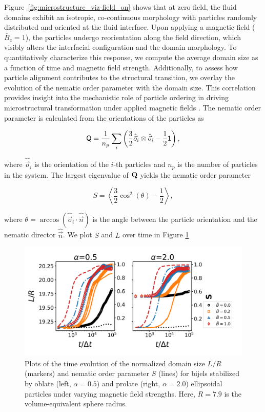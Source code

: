 Figure~\ref{fig:microstructure_viz-field_on} shows that at zero field, the fluid domains exhibit an isotropic, co-continuous morphology with particles randomly 
distributed and oriented at the fluid interface. Upon applying a magnetic field (\(\bar{B}_z = 1\)), the particles undergo reorientation along the field direction, 
which visibly alters the interfacial configuration and the domain morphology. 
To quantitatively characterize this response, we compute the average domain size as a function of time and magnetic field strength. Additionally, to assess 
how particle alignment contributes to the structural transition, we overlay the evolution of the nematic order parameter with the domain size. This correlation 
provides insight into the mechanistic role of particle ordering in driving microstructural transformation under applied magnetic fields \cite{veerman_phase_1992}.
The nematic order parameter is calculated from the orientations of the particles as    

\begin{equation}
\tens{Q} = \frac{1}{n_p} \sum_i \left( \frac{3}{2} \hat{\vec{o}}_i \otimes \hat{\vec{o}}_i -\frac{1}{2}\mathsf{1} \right) ,
\end{equation}

where \(\hat{\vec{o}}_i\) is the orientation of the \(i\)-th particles and \(n_p\) is the number of particles in the system. The largest eigenvalue of 
\(\tens{Q}\) yields the nematic order parameter

\begin{equation}
S = \left\langle \frac{3}{2}\cos^2 (\theta) - \frac{1}{2} \right\rangle ,
\end{equation}

where \(\theta=\arccos(\hat{\vec{o}}_i\cdot\hat{\vec{n}})\) is the angle between the particle orientation and the nematic director \(\hat{\vec{n}}\). We plot $S$
and $L$ over time in Figure \ref{fig:domain_size-field_on}

\begin{figure} 
\centering 
\includegraphics[scale=0.6]{../figures/results/paper2/domain_size-field_on.png} 
\caption{Plots of the time evolution of the normalized domain size \(L/R\) (markers) and nematic order parameter 
         \(S\) (lines) for bijels stabilized by oblate (left, \(\alpha = 0.5\)) and prolate (right, \(\alpha = 2.0\)) ellipsoidal particles under varying 
         magnetic field strengths. Here, \(R = 7.9\) is the volume-equivalent sphere radius.} 
\label{fig:domain_size-field_on} 
\end{figure}


